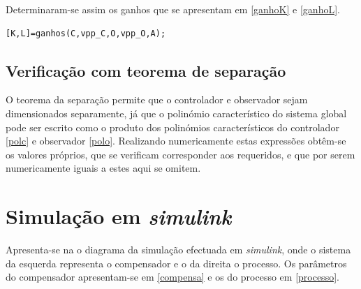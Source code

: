 \documentclass[%
  reprint,
  nofootinbib,
  amsmath,amssymb,
  aps,
  10pt,
  a4paper
]{revtex4-1}
\begin{document}
Determinaram-se assim os ganhos que se apresentam em \eqref{ganhoK} e \eqref{ganhoL}.


\begin{lstlisting}[label=list2, caption={Código Matlab para o cálculo dos ganhos $K$ do controlador e $L$ do observador a partir das matrizes de controlabilidade $\mathcal{C}$, observabilidade $\mathcal{O}$ e da dinâmica $A$, e os valores próprios desejados para o controlador $vpp\_C$ e observador $vpp\_O$. A função {\it ganhos} apresenta-se em anexo no ficheiro com o mesmo nome.}]
[K,L]=ganhos(C,vpp_C,O,vpp_O,A);
\end{lstlisting}
\subsection{Verificação com teorema de separação}
O teorema da separação permite que o controlador e observador sejam dimensionados separamente, já que o polinómio característico do sistema global pode ser escrito como o produto dos polinómios característicos do controlador \eqref{polc} e observador \eqref{polo}.
Realizando numericamente estas expressões obtêm-se os valores próprios, que se verificam corresponder aos requeridos, e que por serem numericamente iguais a estes aqui se omitem.



\section{Simulação em {\it simulink}}

Apresenta-se na  o diagrama da simulação efectuada em {\it simulink}, onde o sistema da esquerda representa o compensador e o da direita o processo. Os parâmetros do compensador apresentam-se em \eqref{compensa} e os do processo em \eqref{processo}.
\end{document}
